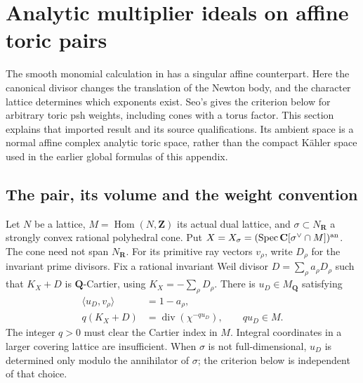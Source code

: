 \section{Analytic multiplier ideals on affine toric pairs}
\label{sec:appH-toric-multiplier-pairs}

The smooth monomial calculation in  has a
singular affine counterpart. Here the canonical divisor changes the
translation of the Newton body, and the character lattice determines
which exponents exist. Seo's \cite[Theorem~6.1, actual pp.~28--29]{Seo26ToricMultiplierV1}
gives the criterion below for arbitrary toric psh weights, including
cones with a torus factor. This section explains that imported result
and its source qualifications. Its ambient space is a normal affine
complex analytic toric space, rather than the compact K\"ahler space
used in the earlier global formulas of this appendix.

\subsection{The pair, its volume and the weight convention}
\label{sec:appH-toric-pair-volume}

Let $N$ be a lattice, $M=\operatorname{Hom}(N,\mathbf Z)$ its actual
dual lattice, and $\sigma\subset N_{\mathbf R}$ a strongly convex
rational polyhedral cone. Put
$X=X_\sigma=(\operatorname{Spec}\mathbf C[\sigma^\vee\cap M])^{\rm an}$.
The cone need not span $N_{\mathbf R}$. For its primitive ray vectors
$v_\rho$, write $D_\rho$ for the invariant prime divisors. Fix a
rational invariant Weil divisor $D=\sum_\rho a_\rho D_\rho$ such that
$K_X+D$ is $\mathbf Q$-Cartier, using $K_X=-\sum_\rho D_\rho$.
There is $u_D\in M_{\mathbf Q}$ satisfying
\begin{equation*}
\begin{aligned}
 \langle u_D,v_\rho\rangle&=1-a_\rho,\\
 q(K_X+D)&=\operatorname{div}(\chi^{-q u_D}),\qquad q u_D\in M.
\end{aligned}
\tag{H.62}\label{eq:appH-toric-canonical-shift}
\end{equation*}
The integer $q>0$ must clear the Cartier index in $M$. Integral
coordinates in a larger covering lattice are insufficient. When
$\sigma$ is not full-dimensional, $u_D$ is determined only modulo
the annihilator of $\sigma$; the criterion below is independent of
that choice.

